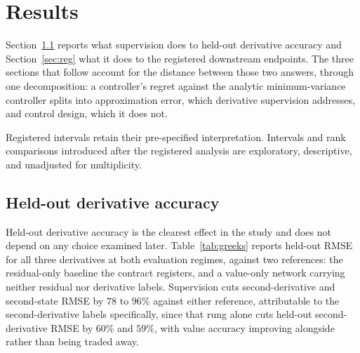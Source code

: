 \documentclass{article}
\begin{document}
\section{Results}
\label{sec:results}

Section~\ref{sec:delivers} reports what supervision does to held-out derivative
accuracy and Section~\ref{sec:reg} what it does to the registered downstream
endpoints. The three sections that follow account for the distance between those
two answers, through one decomposition: a controller's regret against the analytic
minimum-variance controller splits into approximation error, which
derivative supervision addresses, and control design, which it does not.

Registered intervals retain their pre-specified interpretation. Intervals and rank
comparisons introduced after the registered analysis are exploratory, descriptive,
and unadjusted for multiplicity.

\subsection{Held-out derivative accuracy}
\label{sec:delivers}

Held-out derivative accuracy is the clearest effect in the study and does not depend
on any choice examined later. Table~\ref{tab:greeks} reports held-out RMSE for all
three derivatives at both evaluation regimes, against two references: the
residual-only baseline the contract registers, and a value-only network carrying
neither residual nor derivative labels. Supervision cuts second-derivative and
second-state RMSE by $78$ to $96\%$ against either reference, attributable to the
second-derivative labels specifically, since that rung alone cuts held-out
second-derivative RMSE by $60\%$ and $59\%$, with value accuracy improving
alongside rather than being traded away.
\end{document}
